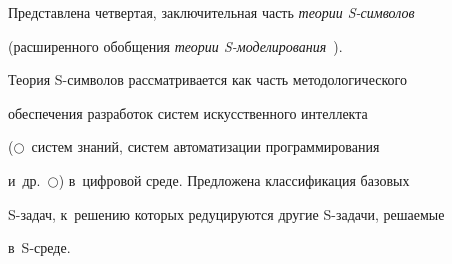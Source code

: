   Представлена четвертая, заключительная часть \textit{теории S-сим\-во\-лов} 


(расширенного обобщения \textit{теории S-мо\-де\-ли\-ро\-ва\-ния}~\cite{11-il}). 


Теория S-сим\-во\-лов рас\-смат\-ри\-ва\-ет\-ся как часть методологического 


обеспечения разработок сис\-тем искусственного интеллекта  


($\bigcirc$~сис\-тем знаний, сис\-тем автоматизации \mbox{программирования} 


и~др.~$\bigcirc$) в~циф\-ро\-вой среде. Предложена классификация базовых  


S-за\-дач, к~решению которых редуцируются другие S-за\-да\-чи, ре\-ша\-емые  


в~\mbox{S-среде}. 


  



